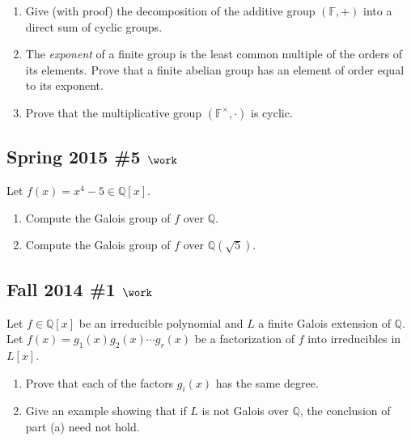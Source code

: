 \begin{enumerate}
\def\labelenumi{\alph{enumi}.}
\item
  Give (with proof) the decomposition of the additive group
  \(({\mathbb{F}}, +)\) into a direct sum of cyclic groups.
\item
  The \emph{exponent} of a finite group is the least common multiple of
  the orders of its elements. Prove that a finite abelian group has an
  element of order equal to its exponent.
\item
  Prove that the multiplicative group \(({\mathbb{F}}^{\times}, \cdot)\)
  is cyclic.
\end{enumerate}

\hypertarget{spring-2015-5-work}{%
\subsection{\texorpdfstring{Spring 2015 \#5
\(\work\)}{Spring 2015 \#5 \textbackslash work}}\label{spring-2015-5-work}}

Let \(f(x) = x^4 - 5 \in {\mathbb{Q}}[x]\).

\begin{enumerate}
\def\labelenumi{\alph{enumi}.}
\item
  Compute the Galois group of \(f\) over \({\mathbb{Q}}\).
\item
  Compute the Galois group of \(f\) over \({\mathbb{Q}}(\sqrt{5})\).
\end{enumerate}

\hypertarget{fall-2014-1-work}{%
\subsection{\texorpdfstring{Fall 2014 \#1
\(\work\)}{Fall 2014 \#1 \textbackslash work}}\label{fall-2014-1-work}}

Let \(f\in {\mathbb{Q}}[x]\) be an irreducible polynomial and \(L\) a
finite Galois extension of \({\mathbb{Q}}\). Let
\(f(x) = g_1(x)g_2(x)\cdots g_r(x)\) be a factorization of \(f\) into
irreducibles in \(L[x]\).

\begin{enumerate}
\def\labelenumi{\alph{enumi}.}
\item
  Prove that each of the factors \(g_i(x)\) has the same degree.
\item
  Give an example showing that if \(L\) is not Galois over
  \({\mathbb{Q}}\), the conclusion of part (a) need not hold.
\end{enumerate}

